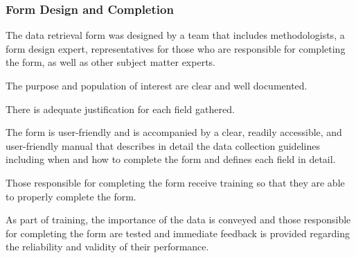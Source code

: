 \subsubsection{Form Design and Completion}

\begin{QandA}
    \item The data retrieval form was designed by a team that includes methodologists, a form design expert, representatives for those who are responsible for completing the form, as well as other subject matter experts.
    \begin{answered}
        
    \end{answered}

    \item The purpose and population of interest are clear and well documented.
    \begin{answered}
        
    \end{answered}

    \item There is adequate justification for each field gathered.
    \begin{answered}
        
    \end{answered}

    \item The form is user-friendly and is accompanied by a clear, readily accessible, and user-friendly manual that describes in detail the data collection guidelines including when and how to complete the form and defines each field in detail.
    \begin{answered}
        
    \end{answered}

    \item Those responsible for completing the form receive training so that they are able to properly complete the form.
    \begin{answered}
        
    \end{answered}

    \item As part of training, the importance of the data is conveyed and those responsible for completing the form are tested and immediate feedback is provided regarding the reliability and validity of their performance.
    \begin{answered}
        

\end{answered}
\end{QandA}
